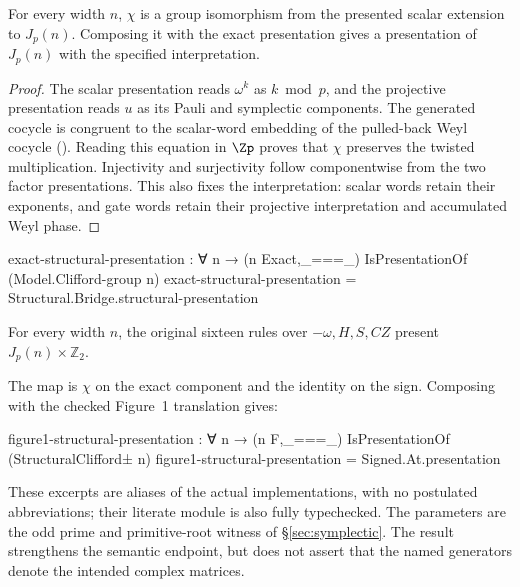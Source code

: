 \begin{theorem}\label{thm:structural}
For every width $n$, $\chi$ is a group isomorphism from the presented
scalar extension to $J_p(n)$. Composing it with the exact presentation
gives a presentation of $J_p(n)$ with the specified interpretation.
\end{theorem}
\begin{proof}
The scalar presentation reads $\omega^k$ as $k\bmod p$, and the
projective presentation reads $u$ as its Pauli and symplectic components.
The generated cocycle is congruent to the scalar-word embedding of the
pulled-back Weyl cocycle ().
Reading this equation in $\Zp$ proves that $\chi$ preserves the twisted
multiplication. Injectivity and surjectivity follow componentwise from
the two factor presentations. This also fixes the interpretation:
scalar words retain their exponents, and gate words retain their
projective interpretation and accumulated Weyl phase.
\end{proof}

\begingroup\renewcommand{\AgdaCodeStyle}{\footnotesize}
\begin{code}
exact-structural-presentation : ∀ n →
  (n Exact,_===_) IsPresentationOf (Model.Clifford-group n)
exact-structural-presentation = Structural.Bridge.structural-presentation
\end{code}
\endgroup

\begin{theorem}\label{thm:figure1}
For every width $n$, the original sixteen rules over $-\omega,H,S,CZ$
present $J_p(n)\times\mathbb Z_2$.
\end{theorem}
The map is $\chi$ on the exact component and the identity on the sign.
Composing with the checked Figure~1 translation gives:
\begingroup\renewcommand{\AgdaCodeStyle}{\footnotesize}
\begin{code}
figure1-structural-presentation : ∀ n →
  (n F,_===_) IsPresentationOf (StructuralClifford± n)
figure1-structural-presentation = Signed.At.presentation
\end{code}
\endgroup
These excerpts are aliases of the actual implementations, with no
postulated abbreviations; their literate module is also fully typechecked.
The parameters are the odd prime and primitive-root witness of
\S\ref{sec:symplectic}. The result strengthens the semantic endpoint,
but does not assert that the named generators denote the intended
complex matrices.


